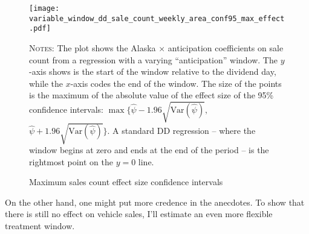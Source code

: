 \documentclass[11pt,letterpaper,oneside]{article}
\newcommand{\Var}{\text{Var}}
\newcommand{\snippet}[1]{\hspace{-0.15em}}
\begin{document}
\begin{figure}[hbt]
     \caption{Maximum sales count effect size confidence intervals}
     \label{fig:variable_window_sale_count_conf95_max_effect}
        \texttt{[image: variable\_window\_dd\_sale\_count\_weekly\_area\_conf95\_max\_effect.pdf]}

    {\footnotesize
    \textsc{Notes:} The plot shows the Alaska $\times$ anticipation coefficients on sale count from a regression with a varying ``anticipation'' window.
    The $y$-axis shows is the start of the window relative to the dividend day, while the $x$-axis codes the end of the window.
    The size of the points is the maximum of the absolute value of the effect size of the 95\% confidence intervals: $\max \big\{ \hat{\psi} - 1.96 \sqrt{\Var(\hat{\psi})},$ $ \hat{\psi} + 1.96 \sqrt{\Var(\hat{\psi})} \big\}$.
    A standard DD regression -- where the window begins at zero and ends at the end of the period -- is the rightmost point on the $y=0$ line.
    }
\end{figure}

On the other hand, one might put more credence in the anecdotes.
To show that there is still no effect on vehicle sales, I'll estimate an even more flexible treatment window.





%
\end{document}
